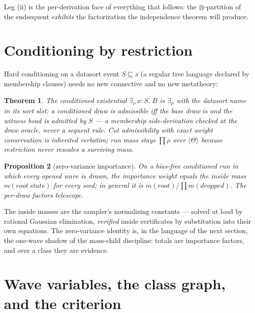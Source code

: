 \documentclass[11pt]{article}
\newcommand{\tensor}{\otimes}
\newcommand{\erho}[2]{\exists_{\rho}\, #1{:}#2.\;}
\newcommand{\trz}[1]{\langle #1\rangle}
\newcommand{\Tr}{\Theta}
\newtheorem{theorem}{Theorem}[section]
\newtheorem{proposition}[theorem]{Proposition}
\theoremstyle{definition}
\theoremstyle{remark}
\begin{document}
Leg (ii) is the per-derivation face of everything that follows: the
$\tensor$-partition of the endsequent \emph{exhibits} the factorization
the independence theorem will produce.

\section{Conditioning by restriction}
\label{sec:conditioning}

Hard conditioning on a datasort event $S \sqsubseteq s$ (a regular tree
language declared by membership clauses) needs no new connective and no
new metatheory:

\begin{theorem}
\label{thm:restriction}
The conditioned existential $\erho{x}{S}B$ \emph{is} $\exists_\rho$
with the datasort name in its sort slot: a conditioned draw is
admissible iff the base draw is and the witness head is admitted by
$S$ --- a membership side-derivation checked at the draw oracle, never
a sequent rule.  Cut admissibility with exact weight conservation is
inherited verbatim; run mass stays $\prod\rho$ over $\trz{\Tr}$
because restriction never rescales a surviving mass.
\end{theorem}

\begin{proposition}[zero-variance importance]
\label{prop:zerovar}
On a bias-free conditioned run in which every opened wave is drawn,
the importance weight equals the inside mass $m(\mathit{root\ state})$
for every seed; in general it is $m(\mathit{root})/\prod
m(\mathit{dropped})$.  The per-draw factors telescope.
\end{proposition}

The inside masses are the sampler's normalizing constants --- solved at
load by rational Gaussian elimination, \emph{verified} inside
certificates by substitution into their own equations.  The
zero-variance identity is, in the language of the next section, the
one-wave shadow of the mass-child discipline: totals are importance
factors, and over a class they are evidence.

\section{Wave variables, the class graph, and the criterion}
\label{sec:defs}
\end{document}
